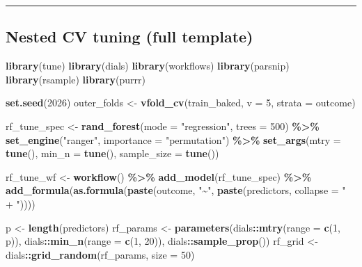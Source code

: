 \documentclass[
  11pt,
]{article}
\newenvironment{Shaded}{\begin{snugshade}}{\end{snugshade}}
\newcommand{\AttributeTok}[1]{\textcolor[rgb]{0.13,0.29,0.53}{#1}}
\newcommand{\DecValTok}[1]{\textcolor[rgb]{0.00,0.00,0.81}{#1}}
\newcommand{\FunctionTok}[1]{\textcolor[rgb]{0.13,0.29,0.53}{\textbf{#1}}}
\newcommand{\NormalTok}[1]{#1}
\newcommand{\OtherTok}[1]{\textcolor[rgb]{0.56,0.35,0.01}{#1}}
\newcommand{\SpecialCharTok}[1]{\textcolor[rgb]{0.81,0.36,0.00}{\textbf{#1}}}
\newcommand{\StringTok}[1]{\textcolor[rgb]{0.31,0.60,0.02}{#1}}
\begin{document}
\begin{center}\rule{0.5\linewidth}{0.5pt}\end{center}

\subsection{Nested CV tuning (full
template)}\label{nested-cv-tuning-full-template}

\begin{Shaded}
\begin{Highlighting}[]
\FunctionTok{library}\NormalTok{(tune)}
\FunctionTok{library}\NormalTok{(dials)}
\FunctionTok{library}\NormalTok{(workflows)}
\FunctionTok{library}\NormalTok{(parsnip)}
\FunctionTok{library}\NormalTok{(rsample)}
\FunctionTok{library}\NormalTok{(purrr)}

\FunctionTok{set.seed}\NormalTok{(}\DecValTok{2026}\NormalTok{)}
\NormalTok{outer\_folds }\OtherTok{\textless{}{-}} \FunctionTok{vfold\_cv}\NormalTok{(train\_baked, }\AttributeTok{v =} \DecValTok{5}\NormalTok{, }\AttributeTok{strata =}\NormalTok{ outcome)}

\NormalTok{rf\_tune\_spec }\OtherTok{\textless{}{-}} \FunctionTok{rand\_forest}\NormalTok{(}\AttributeTok{mode =} \StringTok{"regression"}\NormalTok{, }\AttributeTok{trees =} \DecValTok{500}\NormalTok{) }\SpecialCharTok{\%\textgreater{}\%}
  \FunctionTok{set\_engine}\NormalTok{(}\StringTok{"ranger"}\NormalTok{, }\AttributeTok{importance =} \StringTok{"permutation"}\NormalTok{) }\SpecialCharTok{\%\textgreater{}\%}
  \FunctionTok{set\_args}\NormalTok{(}\AttributeTok{mtry =} \FunctionTok{tune}\NormalTok{(), }\AttributeTok{min\_n =} \FunctionTok{tune}\NormalTok{(), }\AttributeTok{sample\_size =} \FunctionTok{tune}\NormalTok{())}

\NormalTok{rf\_tune\_wf }\OtherTok{\textless{}{-}} \FunctionTok{workflow}\NormalTok{() }\SpecialCharTok{\%\textgreater{}\%} \FunctionTok{add\_model}\NormalTok{(rf\_tune\_spec) }\SpecialCharTok{\%\textgreater{}\%} \FunctionTok{add\_formula}\NormalTok{(}\FunctionTok{as.formula}\NormalTok{(}\FunctionTok{paste}\NormalTok{(outcome, }\StringTok{"\textasciitilde{}"}\NormalTok{, }\FunctionTok{paste}\NormalTok{(predictors, }\AttributeTok{collapse =} \StringTok{" + "}\NormalTok{))))}

\NormalTok{p }\OtherTok{\textless{}{-}} \FunctionTok{length}\NormalTok{(predictors)}
\NormalTok{rf\_params }\OtherTok{\textless{}{-}} \FunctionTok{parameters}\NormalTok{(dials}\SpecialCharTok{::}\FunctionTok{mtry}\NormalTok{(}\AttributeTok{range =} \FunctionTok{c}\NormalTok{(}\DecValTok{1}\NormalTok{, p)), dials}\SpecialCharTok{::}\FunctionTok{min\_n}\NormalTok{(}\AttributeTok{range =} \FunctionTok{c}\NormalTok{(}\DecValTok{1}\NormalTok{, }\DecValTok{20}\NormalTok{)), dials}\SpecialCharTok{::}\FunctionTok{sample\_prop}\NormalTok{())}
\NormalTok{rf\_grid }\OtherTok{\textless{}{-}}\NormalTok{ dials}\SpecialCharTok{::}\FunctionTok{grid\_random}\NormalTok{(rf\_params, }\AttributeTok{size =} \DecValTok{50}\NormalTok{)}


\end{Highlighting}
\end{Shaded}
\end{document}
